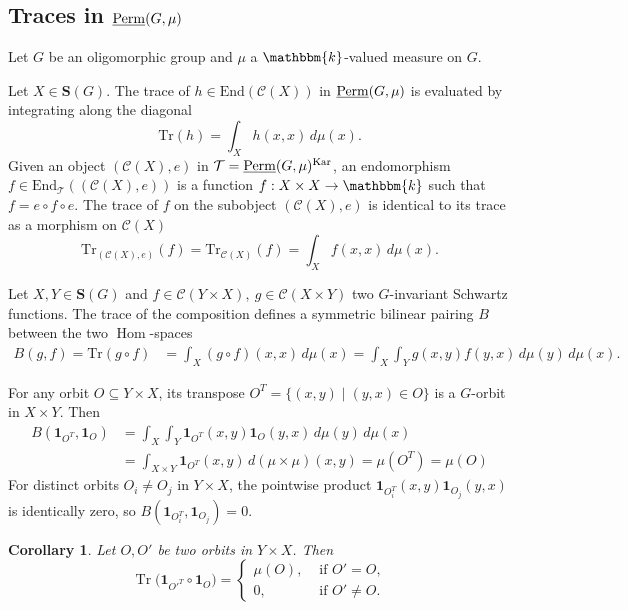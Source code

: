 \documentclass[11pt,a4paper]{amsart}
\theoremstyle{plain}%
\newtheorem{corollary}[lemma]{Corollary}
\theoremstyle{definition}
\theoremstyle{remark}
\newcommand{\Hom}{\operatorname{Hom}}
\newcommand{\Perm}{\underline{{\rm Perm}}}
\newcommand{\kk}{\mathbbm{k}}
\newcommand{\one}{{\mathbf{1}}}
\newcommand{\T}{\mathcal{T}}
\newcommand{\Kar}{\mathrm{Kar}}
\newcommand{\cC}{\mathcal{C}}
\newcommand{\Set}[1]{\mathbf{S}(#1)}
\begin{document}




\subsection{Traces in \texorpdfstring{$\Perm(G,\mu)$}{permutation categories}}

Let $G$ be an oligomorphic group and $\mu$ a $\kk$-valued measure on $G$.

Let $X\in \Set{G}$. The trace of $h \in \mathrm{End}(\mathcal{C}(X))$ in $\Perm(G,\mu)$ is evaluated by integrating along the diagonal
\[\mathrm{Tr}(h) = \int_X h(x, x) \, d\mu(x). \] Given an object $(\mathcal{C}(X),e)$ in $\mathcal{T}=\Perm(G,\mu)^{\Kar}$, an endomorphism $f \in \mathrm{End}_{\T}((\mathcal{C}(X), e))$ is a function $f: X \times X \to {\kk}$ such that $f = e \circ f \circ e$. The trace of $f$ on the subobject $(\mathcal{C}(X), e)$ is identical to its trace as a morphism on $\mathcal{C}(X)$
\[ \mathrm{Tr}_{(\mathcal{C}(X),e)}(f) = \mathrm{Tr}_{\mathcal{C}(X)}(f) = \int_X f(x, x) \, d\mu(x).\]


Let $X,Y\in \Set{G}$ and $f\in \cC(Y \times X), ~g\in \cC( X \times Y)$ two $G$-invariant Schwartz functions. 
The trace of the composition defines a symmetric bilinear pairing $B$ between the two $\Hom$-spaces
\begin{align*}
B(g, f)=\mathrm{Tr}(g \circ f) &= \int_X (g \circ f)(x, x) \, d\mu(x)= \int_X \int_Y g(x, y) f(y, x) \, d\mu(y) \, d\mu(x). 
\end{align*}



For any orbit $O \subseteq Y \times X$, its transpose $O^T = \{(x, y) \mid (y, x) \in O\}$ is a $G$-orbit in $X \times Y$. Then
\begin{align*}
B(\one_{O^T}, \one_O) &= \int_X \int_Y \one_{O^T}(x, y) \one_O(y, x) \, d\mu(y) \, d\mu(x) \\
&= \int_{X \times Y} \one_{O^T}(x, y) \, d(\mu \times \mu)(x, y) = \mu(O^T) = \mu(O)
\end{align*}
For distinct orbits $O_i \neq O_j$ in $Y\times X$, the pointwise product $\one_{O_i^T}(x, y) \one_{O_j}(y, x)$ is identically zero, so $B(\one_{O_i^T}, \one_{O_j}) = 0$.

\begin{corollary} \label{cor:trace-diagonal} Let $O,O'$ be two orbits in $Y \times X$.  Then \[ \operatorname{Tr}\bigl(\one_{O'^{T}}\circ\one_O\bigr)
 =\begin{cases}
      \mu(O),&\text{ if } O'=O,\\
      0,&\text{ if } O'\ne O.
   \end{cases}\]
\end{corollary}
\end{document}
